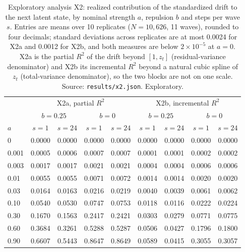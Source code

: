 \begin{table}[htbp]
\centering
\footnotesize
\caption{Exploratory analysis X2: realized contribution of the standardized drift to the next latent state, by nominal strength $a$, repulsion $b$ and steps per wave $s$. Entries are means over 10 replicates ($N=10{,}626$, 11 waves), rounded to four decimals; standard deviations across replicates are at most 0.0024 for X2a and 0.0012 for X2b, and both measures are below $2\times10^{-5}$ at $a=0$. X2a is the partial $R^2$ of the drift beyond $[1,z_t]$ (residual-variance denominator) and X2b its incremental $R^2$ beyond a natural cubic spline of $z_t$ (total-variance denominator), so the two blocks are not on one scale. Source: \texttt{results/x2.json}. Exploratory.}
\label{tab:supp-x2}
\begin{tabular}{@{}lcccccccc@{}}
\hline
 & \multicolumn{4}{c}{X2a, partial $R^2$} & \multicolumn{4}{c}{X2b, incremental $R^2$} \\
 & \multicolumn{2}{c}{$b=0.25$} & \multicolumn{2}{c}{$b=0$} & \multicolumn{2}{c}{$b=0.25$} & \multicolumn{2}{c}{$b=0$} \\
$a$ & $s=1$ & $s=24$ & $s=1$ & $s=24$ & $s=1$ & $s=24$ & $s=1$ & $s=24$ \\
\hline
0 & 0.0000 & 0.0000 & 0.0000 & 0.0000 & 0.0000 & 0.0000 & 0.0000 & 0.0000 \\
0.001 & 0.0005 & 0.0006 & 0.0007 & 0.0007 & 0.0001 & 0.0001 & 0.0002 & 0.0002 \\
0.003 & 0.0017 & 0.0017 & 0.0021 & 0.0021 & 0.0004 & 0.0004 & 0.0006 & 0.0006 \\
0.01 & 0.0055 & 0.0055 & 0.0071 & 0.0072 & 0.0014 & 0.0014 & 0.0020 & 0.0020 \\
0.03 & 0.0164 & 0.0163 & 0.0216 & 0.0219 & 0.0040 & 0.0039 & 0.0061 & 0.0062 \\
0.10 & 0.0540 & 0.0530 & 0.0747 & 0.0753 & 0.0118 & 0.0116 & 0.0222 & 0.0224 \\
0.30 & 0.1670 & 0.1563 & 0.2417 & 0.2421 & 0.0303 & 0.0279 & 0.0771 & 0.0775 \\
0.60 & 0.3684 & 0.3261 & 0.5288 & 0.5287 & 0.0506 & 0.0427 & 0.1796 & 0.1800 \\
0.90 & 0.6607 & 0.5443 & 0.8647 & 0.8649 & 0.0589 & 0.0415 & 0.3055 & 0.3057 \\
\hline
\end{tabular}
\end{table}

